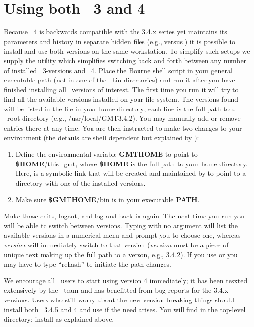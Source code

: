 %
%

\chapter{Using both \gmt\ 3 and 4}
\thispagestyle{headings}

Because \GMT\ 4 is backwards compatible with the 3.4.x series yet maintains its parameters
and history in separate hidden files (e.g.,  versus )
it is possible to install and use both versions on the same workstation.  To simplify such
setups we supply the utility  which simplifies switching back and forth
between any number of installed \GMT\ 3-versions and \GMT\ 4.  Place the  Bourne shell script in your
general executable path (not in one of the \GMT\ bin directories) and run it after you have
finished installing all \GMT\ versions of interest.  The first time you run 
it will try to find all the available versions installed on your file system.  The versions
found will be listed in the file  in your home directory; each line
is the full path to a \GMT\ root directory (e.g., /usr/local/GMT3.4.2).  You may
manually add or remove entries there at any time.  You are then instructed to make two
changes to your environment (the detauls are shell dependent but explained by ):
\begin{enumerate}
\item Define the environmental variable {\bf GMTHOME} to point to {\bf \$HOME}/this\_gmt,
where {\bf \$HOME} is the full path to your home directory.
Here,  is a symbolic link that will be created and maintained by 
to point to a directory with one of the installed versions. 
\item Make sure {\bf \$GMTHOME}/bin is in your executable {\bf PATH}.
\end{enumerate}
Make those edits, logout, and log and back in again.  The next time you run 
you will be able to switch between versions.  Typing  with no argument will list the
available versions in a numerical menu and prompt you to choose one, whereas  {\it version}
will immediately switch to that version ({\it version} must be a piece of unique text making
up the full path to a verson, e.g., 3.4.2).  If you use  or  you may have to type
``rehash'' to initiate the path changes.

We encourage all \GMT\ users to start using version 4 immediately; it has been tesxted extensively by
the \GMT\ team and has benefitted from bug reports for the 3.4.x versions.  Users who still worry about the
new version breaking things should install both \GMT\ 3.4.5 and 4 and use  if the need
arises.  You will find  in the top-level  directory; install as explained above.
